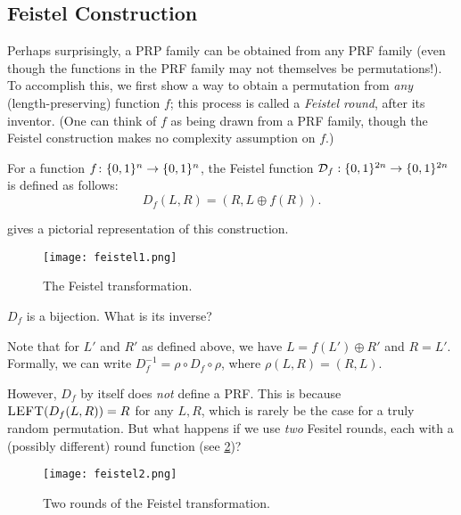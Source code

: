 \documentclass[11pt]{article}
\begin{document}
\subsection{Feistel Construction}
\label{sec:feistel-construction}

Perhaps surprisingly, a PRP family can be obtained from any PRF family
(even though the functions in the PRF family may not themselves be
permutations!).  To accomplish this, we first show a way to obtain a
permutation from \emph{any} (length-preserving) function $f$; this
process is called a \emph{Feistel round}, after its inventor.  (One
can think of $f$ as being drawn from a PRF family, though the Feistel
construction makes no complexity assumption on $f$.)

\begin{definition}
  \label{def:feistel-round}
  For a function $f \colon \{0,1\}^{n} \to \{0,1\}^{n}$, the Feistel
  function $\mathcal D_f : \{0,1\}^{2n} \rightarrow \{0,1\}^{2n}$ is defined
  as follows:
  \[ D_f(L, R) = (R,L \oplus f(R) ). \]
\end{definition}

 gives a pictorial representation of
this construction.

\begin{figure}[h]
  \centering
  \texttt{[image: feistel1.png]}
  \caption{The Feistel transformation.}
  \label{fig:feistel_1_pic}
\end{figure}

\begin{question}
  \(D_f\) is a bijection. What is its inverse?
\end{question}

\begin{answer}
  Note that for $L'$ and $R'$ as defined above, we have
  $L = f(L') \oplus R'$ and $R = L'$.  Formally, we can write
  $D_{f}^{-1} = \rho \circ D_f \circ \rho$, where $\rho(L,R) = (R,L)$.
\end{answer}

However, $D_{f}$ by itself does \emph{not} define a PRF.  This is
because $\textsc{LEFT}( D_f(L,R) ) = R$ for any $L,R$, which is rarely
be the case for a truly random permutation.  But what happens if we
use \emph{two} Fesitel rounds, each with a (possibly different) round
function (see \cref{fig:feistel_2_pic})?

\begin{figure}[h]
  \centering
  \texttt{[image: feistel2.png]}
  \caption{Two rounds of the Feistel transformation.}
  \label{fig:feistel_2_pic}
\end{figure}
\end{document}

